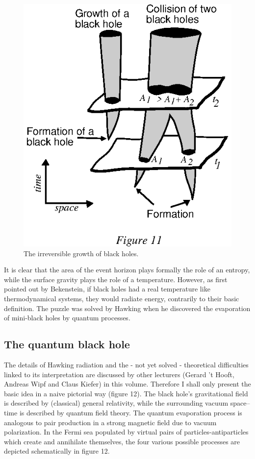 \documentclass[12pt]{article}
\begin{document}
\begin{figure}[tb]
  \begin{center}
    \leavevmode
    \includegraphics{area.ps}       
    \caption{The irreversible growth of black holes.}
  \end{center}
\end{figure}
It is clear that the area of the event horizon plays formally the
role of an entropy, while the surface gravity plays the role
of a temperature. However, as first pointed out by
Bekenstein, if black holes had a real temperature like thermodynamical systems,
they would radiate energy, contrarily to their basic definition. The puzzle
was solved by Hawking when he discovered the evaporation of mini-black
holes by quantum processes.

\subsection {The quantum black hole}

The details of Hawking radiation and the - not yet
solved - theoretical difficulties linked to its interpretation are discussed by other lecturers 
(Gerard 't Hooft, Andreas Wipf and Claus
Kiefer) in this volume. Therefore I shall only present the basic 
idea in a naive pictorial way (figure 12).
The black hole's gravitational field is described by (classical) general
relativity, while the surrounding vacuum space--time is described by quantum field theory.
The quantum evaporation process is analogous to pair production in a strong
magnetic field due to vacuum polarization. In the Fermi sea populated by
virtual pairs of particles-antiparticles which create and annihilate themselves,
the four various possible processes are depicted schematically in figure 
12.
\end{document}
